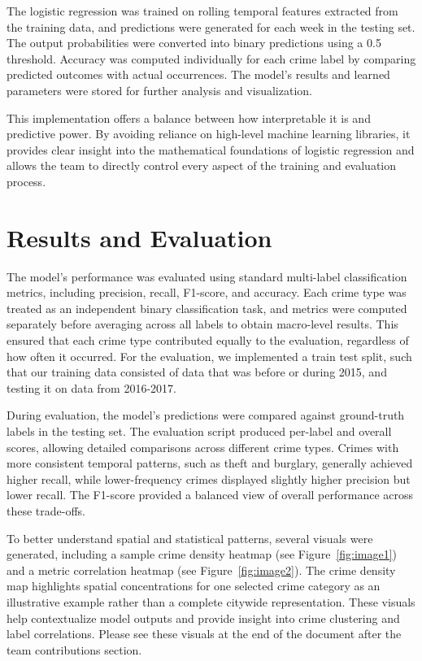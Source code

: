 \documentclass[11pt]{article}
\begin{document}
The logistic regression was trained on rolling temporal features extracted from the training data, and predictions were generated for each week in the testing set. The output probabilities were converted into binary predictions using a 0.5 threshold. Accuracy was computed individually for each crime label by comparing predicted outcomes with actual occurrences. The model’s results and learned parameters were stored for further analysis and visualization.

This implementation offers a balance between how interpretable it is and predictive power. By avoiding reliance on high-level machine learning libraries, it provides clear insight into the mathematical foundations of logistic regression and allows the team to directly control every aspect of the training and evaluation process.

\section{Results and Evaluation}

The model’s performance was evaluated using standard multi-label classification metrics, including precision, recall, F1-score, and accuracy. Each crime type was treated as an independent binary classification task, and metrics were computed separately before averaging across all labels to obtain macro-level results. This ensured that each crime type contributed equally to the evaluation, regardless of how often it occurred. For the evaluation, we implemented a train test split, such that our training data consisted of data that was before or during 2015, and testing it on data from 2016-2017.

During evaluation, the model’s predictions were compared against ground-truth labels in the testing set. The evaluation script produced per-label and overall scores, allowing detailed comparisons across different crime types. Crimes with more consistent temporal patterns, such as theft and burglary, generally achieved higher recall, while lower-frequency crimes displayed slightly higher precision but lower recall. The F1-score provided a balanced view of overall performance across these trade-offs.

To better understand spatial and statistical patterns, several visuals were generated, including a sample crime density heatmap (see Figure~\ref{fig:image1}) and a metric correlation heatmap (see Figure~\ref{fig:image2}). The crime density map highlights spatial concentrations for one selected crime category as an illustrative example rather than a complete citywide representation. These visuals help contextualize model outputs and provide insight into crime clustering and label correlations. Please see these visuals at the end of the document after the team contributions section.
\end{document}
